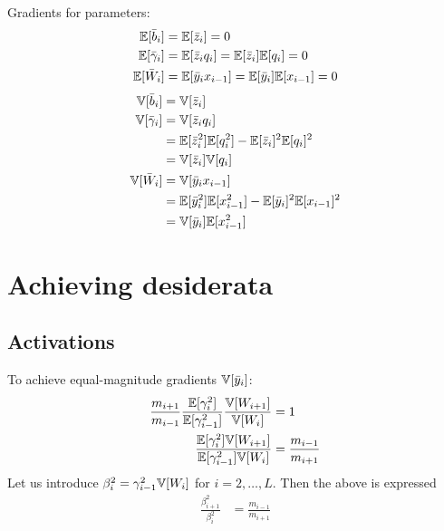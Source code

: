 Gradients for parameters:
\begin{align}
\mathbb{E}[\bar{b}_{i}] & = \mathbb{E}[\bar{z}_{i}] = 0 \\
\mathbb{E}[\bar{\gamma}_{i}] & = \mathbb{E}[\bar{z}_{i} q_{i}] = \mathbb{E}[\bar{z}_{i}] \mathbb{E}[q_{i}] = 0 \\
\mathbb{E}[\bar{W}_{i}] & = \mathbb{E}[\bar{y}_{i} x_{i-1}] = \mathbb{E}[\bar{y}_{i}] \mathbb{E}[x_{i-1}] = 0
\end{align}
\begin{align}
\mathbb{V}[\bar{b}_{i}] & = \mathbb{V}[\bar{z}_{i}] \\
\mathbb{V}[\bar{\gamma}_{i}] & = \mathbb{V}[\bar{z}_{i} q_{i}] \\
& = \mathbb{E}[\bar{z}_{i}^2] \mathbb{E}[q_{i}^2] - \mathbb{E}[\bar{z}_{i}]^2 \mathbb{E}[q_{i}]^2 \\
& = \mathbb{V}[\bar{z}_{i}] \mathbb{V}[q_{i}] \\
\mathbb{V}[\bar{W}_{i}] & = \mathbb{V}[\bar{y}_{i} x_{i-1}] \\
& = \mathbb{E}[\bar{y}_{i}^2] \mathbb{E}[x_{i-1}^2] - \mathbb{E}[\bar{y}_{i}]^2 \mathbb{E}[x_{i-1}]^2 \\
& = \mathbb{V}[\bar{y}_{i}] \mathbb{E}[x_{i-1}^2]
\end{align}

\section{Achieving desiderata}

\subsection{Activations}

To achieve equal-magnitude gradients $\mathbb{V}[\bar{y}_{i}]$:
\begin{align}
\frac{ m_{i+1} }{ m_{i-1} } \frac{ \mathbb{E}[\gamma_{i}^2] }{ \mathbb{E}[\gamma_{i-1}^2] } \frac{ \mathbb{V}[W_{i+1}] }{ \mathbb{V}[W_{i}] } & = 1 \\
\frac{ \mathbb{E}[\gamma_{i}^2] \mathbb{V}[W_{i+1}] }{ \mathbb{E}[\gamma_{i-1}^2] \mathbb{V}[W_{i}] } & = \frac{ m_{i-1} }{ m_{i+1} }
\end{align}
Let us introduce $\beta_{i}^2 = \gamma_{i-1}^2 \mathbb{V}[W_{i}]$ for $i = 2, \dots, L$.
Then the above is expressed
\begin{align}
\frac{\beta_{i+1}^2}{\beta_{i}^2} & = \frac{ m_{i-1} }{ m_{i+1} }
\end{align}

